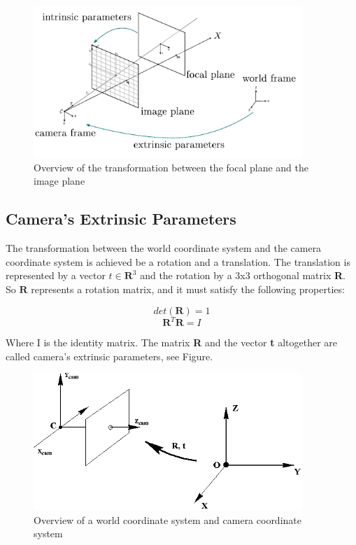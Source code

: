 \begin{figure}[!h]
\begin{center}
\includegraphics[width=4in]{figures02/intrinsic.png}
\caption{Overview of the transformation between the focal plane and the image plane}%
\label{fig:intrinsic}
\end{center}
\end{figure}


\subsection{Camera's Extrinsic Parameters}

The transformation between the world coordinate system and the camera coordinate system is achieved be a rotation and a translation. The translation is represented by a vector $t \in \textbf{R}^{3}$ and the rotation by a 3x3 orthogonal matrix \textbf{R}. So $\textbf{R}$ represents a rotation matrix, and it must satisfy the following properties:

\begin{equation}\label{eq3} 
     det(\textbf{R})=1 
\end{equation}
\begin{equation}\label{eq4}  
    \textbf{R}^{T}\textbf{R}=I      
\end{equation}


Where I is the identity matrix. The matrix \textbf{R} and the vector \textbf{t} altogether are called camera's extrinsic parameters, see Figure.

\begin{figure}[!h]
\begin{center}
\includegraphics[width=4in]{figures02/extrinsic.png}
\caption{Overview of a world coordinate system and camera coordinate system}%
\end{center}
\end{figure}


